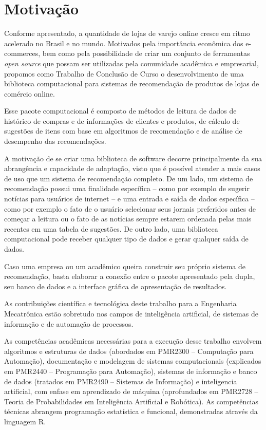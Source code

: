 \section{Motivação} %
\label{cha:motivacao}

Conforme apresentado, a quantidade de lojas de varejo online cresce em ritmo acelerado no Brasil e no mundo. Motivados pela importância econômica dos e-commerces, bem como pela possibilidade de criar um conjunto de ferramentas \textit{open source} que possam ser utilizadas pela comunidade acadêmica e empresarial, propomos como Trabalho de Conclusão de Curso o desenvolvimento de uma biblioteca computacional para sistemas de recomendação de produtos de lojas de comércio online.

Esse pacote computacional é composto de métodos de leitura de dados de histórico de compras e de informações de clientes e produtos, de cálculo de sugestões de itens com base em algoritmos de recomendação e de análise de desempenho das recomendações. 

A motivação de se criar uma biblioteca de software decorre principalmente da sua abrangência e capacidade de adaptação, visto que é possível atender a mais casos de uso que um sistema de recomendação completo. De um lado, um sistema de recomendação possui uma finalidade específica -- como por exemplo de sugerir notícias para usuários de internet -- e uma entrada e saída de dados específica -- como por exemplo o fato de o usuário selecionar seus jornais preferidos antes de começar a leitura ou o fato de as notícias sempre estarem ordenada pelas mais recentes em uma tabela de sugestões. De outro lado, uma biblioteca computacional pode receber qualquer tipo de dados e gerar qualquer saída de dados. 

Caso uma empresa ou um acadêmico queira construir seu próprio sistema de recomendação, basta elaborar a conexão entre o pacote apresentado pela dupla, seu banco de dados e a interface gráfica de apresentação de resultados.

As contribuições científica e tecnológica deste trabalho para a Engenharia Mecatrônica estão sobretudo nos campos de inteligência artificial, de sistemas de informação e de automação de processos.

As competências acadêmicas necessárias para a execução desse trabalho envolvem algoritmos e estruturas de dados (abordados em PMR2300 -- Computação para Automação), documentação e modelagem de sistemas computacionais (explicados em PMR2440 -- Programação para Automação), sistemas de informação e banco de dados (tratados em PMR2490 -- Sistemas de Informação) e inteligencia artificial, com enfase em aprendizado de máquina (aprofundados em PMR2728 -- Teoria de Probabilidades em Inteligência Artificial e Robótica). As competências técnicas abrangem programação estatística e funcional, demonstradas através da linguagem R.

